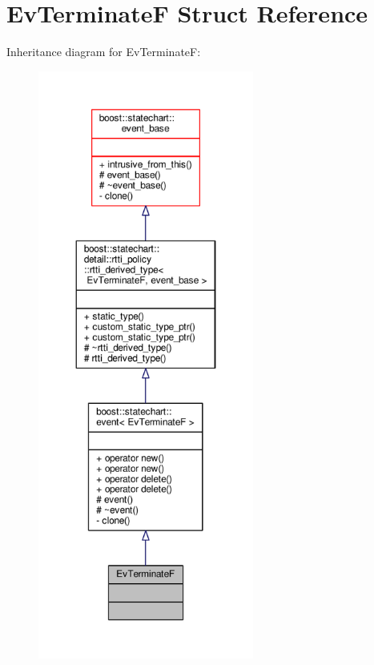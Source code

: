\hypertarget{struct_ev_terminate_f}{}\section{Ev\+TerminateF Struct Reference}
\label{struct_ev_terminate_f}


Inheritance diagram for Ev\+TerminateF\+:
\nopagebreak
\begin{figure}[H]
\begin{center}
\leavevmode
\includegraphics[height=550pt]{struct_ev_terminate_f__inherit__graph}
\end{center}
\end{figure}


